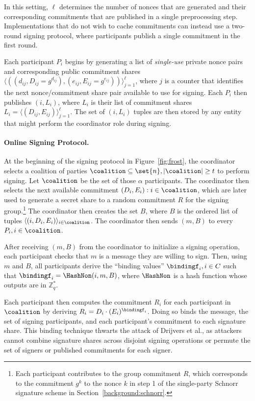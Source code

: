 In this setting, $\ell$ determines the number of
nonces that are generated and their corresponding commitments that are
published in a single preprocessing step.
Implementations that do not wish to cache commitments can instead
use a two-round signing protocol, where participants publish a single
commitment in the first round.

Each participant $P_i$ begins by generating a list of
\emph{single-use} private nonce pairs and corresponding public commitment shares
$\langle((d_{ij}, D_{ij} = g^{d_{ij}}), (e_{ij}, E_{ij} = g^{e_{ij}})) \rangle_{j=1}^\ell$,
where
$j$ is a counter that identifies the next nonce/commitment share pair available
to use for signing.
Each $P_i$ then publishes $(i, L_i)$, where $L_i$ is their list of
commitment shares
$L_i  = \langle(D_{ij}, E_{ij}) \rangle_{j=1}^\ell$.
The set of $(i, L_i)$ tuples are then stored by any entity that might perform
the coordinator role during signing.

\paragraph{Online Signing Protocol.}
At the beginning of the signing protocol in Figure~\ref{fig:frost},
the coordinator selects  a coalition of parties $\coalition \subseteq \set{n}, \lvert \coalition \rvert \geq t$ to perform signing.
Let $\coalition$ be the set of those $\alpha$ participants.
The coordinator then selects the next available commitment
$(D_i, E_i) : i \in \coalition$,
which are later used to generate a secret share to a random commitment $R$ for
the signing group.\footnote{Each participant
contributes to the group commitment $R$, which corresponds to the
commitment $g^k$ to the nonce $k$
in step 1 of the single-party Schnorr signature scheme in
Section~\ref{background:schnorr}.}
%
The coordinator then creates the set $B$, where
$B$ is the ordered list of tuples $\langle(i, D_i, E_i)\rangle_{i \in \coalition}$.
The coordinator then sends $(m, B)$ to every $P_i, i \in \coalition$.

After receiving $(m, B)$ from the coordinator to initialize a signing operation,
each participant checks that $m$ is a message they are willing to sign.
Then, using $m$ and $B$,
all participants derive the ``binding values'' $\bindingf_i, i \in C$ such that
$\bindingf_i = \HashNon(i, m, B)$, where $\HashNon$ is a hash function whose outputs are in $\mathbb{Z}_q^*$.

Each participant then
computes the commitment $R_i$ for each participant in $\coalition$ by
deriving $R_i = D_i \cdot (E_i)^{\bindingf_i}$.
Doing so binds the
message, the set of signing participants, and each participant's commitment
to each signature share.
This binding technique thwarts the attack of Drijvers et al.\cite{DrijversEFKLNS19},
as attackers cannot combine signature shares across disjoint signing operations or permute the set of signers or published
commitments for each signer.

